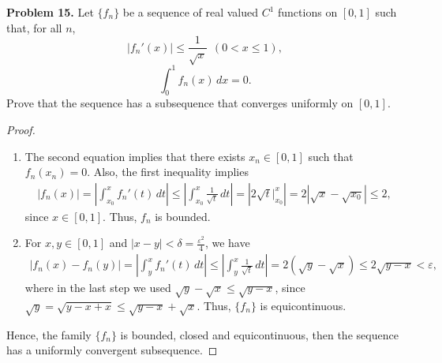 \documentclass[12pt]{article}
\theoremstyle{definition}
\theoremstyle{definition}
\numberwithin{equation}{subsection}
\begin{document}
\medskip

\noindent
{\bf Problem 15.}
Let  $\{f_n\}$ be a sequence of real valued $C^1$ functions on
$[0,1]$ such that, for all $n$,
$$
|f_n'(x)| \leq \frac{1}{\sqrt{x}}
\ \ (0<x\leq 1),
$$
$$
\int_0^1 f_n(x)\, dx = 0.
$$
Prove that the sequence has a subsequence that converges
uniformly on $[0,1]$.
\begin{proof}
~\begin{enumerate}[label=(\arabic*)]
    \item The second equation implies that there exists $x_n \in [0,1]$ such that $f_n(x_n) = 0$. Also, the first inequality implies
    \begin{align*}
        \left|f_n(x)\right| = \left|\int^{x}_{x_0} f_n'(t)\, dt\right| \leq \left|\int^{x}_{x_0} \frac{1}{\sqrt{t}}\, dt\right| = \left|2\sqrt{t} \Big|^{x}_{x_0} \right| = 2 \left|\sqrt{x} - \sqrt{x_0} \right| \leq 2,
    \end{align*}
    since $x\in [0,1]$. Thus, $f_n$ is bounded. 
    
    \item For $x,y\in [0,1]$ and $|x - y| < \delta = \frac{\varepsilon^2}{4}$, we have 
    \begin{align*}
        \left|f_n(x) - f_n(y)\right| = \left|\int^{x}_{y} f_n'(t)\, dt\right| \leq \left|\int^{x}_{y} \frac{1}{\sqrt{t}}\, dt\right| = 2 \left(\sqrt{y} - \sqrt{x}\right) \leq 2 \sqrt{y - x} < \varepsilon,
    \end{align*}
    where in the last step we used $\sqrt{y} - \sqrt{x} \leq \sqrt{y - x}$, since $\sqrt{y} = \sqrt{y-x+x} \leq \sqrt{y-x} + \sqrt{x}$. Thus, $\{f_n\}$ is equicontinuous.
\end{enumerate}
Hence, the family $\{f_n\}$ is bounded, closed and equicontinuous, then the sequence has a uniformly convergent subsequence.
\end{proof}

\medskip
\end{document}
